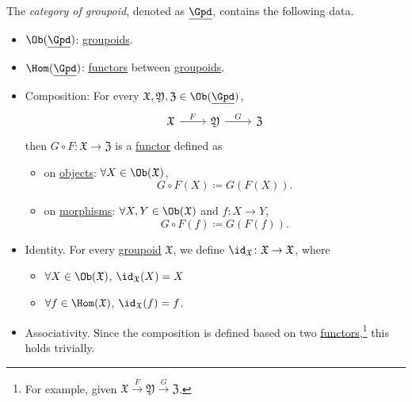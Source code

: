 \begin{definition}\label{def:category-of-groupoid}
	The \emph{category of groupoid}, denoted as \(\underline{\Gpd}\), contains the following data.
	\begin{itemize}
		\item \(\Ob (\underline{\Gpd})\): \hyperref[def:groupoid]{groupoids}.
		\item \(\Hom (\underline{\Gpd})\): \hyperref[def:functor]{functors} between \hyperref[def:groupoid]{groupoids}.
		\item Composition: For every \(\mathfrak{X} , \mathfrak{Y}, \mathfrak{Z} \in \Ob (\underline{\Gpd})\),
		      \[
			      \begin{tikzcd}
				      {\mathfrak{X}} & {\mathfrak{Y}} & {\mathfrak{Z}}
				      \arrow["F", from=1-1, to=1-2]
				      \arrow["G", from=1-2, to=1-3]
			      \end{tikzcd}
		      \]
		      then \(G\circ F\colon \mathfrak{X} \to \mathfrak{Z}\) is a \hyperref[def:functor]{functor} defined as
		      \begin{itemize}
			      \item on \hyperref[def:object]{objects}: \(\forall X\in \Ob (\mathfrak{X})\),
			            \[
				            G\circ F(X)\coloneqq G(F(X)).
			            \]
			      \item on \hyperref[def:morphism]{morphisms}: \(\forall X, Y\in \Ob (\mathfrak{X})\) and \(f\colon X\to Y\),
			            \[
				            G\circ F(f)\coloneqq G(F(f)).
			            \]
		      \end{itemize}
		\item Identity. For every \hyperref[def:groupoid]{groupoid} \(\mathfrak{X}\), we define \(\id_{\mathfrak{X}}\colon \mathfrak{X}\to \mathfrak{X} \), where
		      \begin{itemize}
			      \item \(\forall X\in \Ob (\mathfrak{X})\), \(\id_{\mathfrak{X}}(X) = X \)
			      \item \(\forall f\in \Hom (\mathfrak{X})\), \(\id_{\mathfrak{X}}(f) = f \).
		      \end{itemize}
		\item Associativity. Since the composition is defined based on two \hyperref[def:functor]{functors},\footnote{For example, given \(\mathfrak{X} \overset{F}{\to } \mathfrak{Y} \overset{G}{\to } \mathfrak{Z}\).} this holds trivially.
	\end{itemize}
\end{definition}
